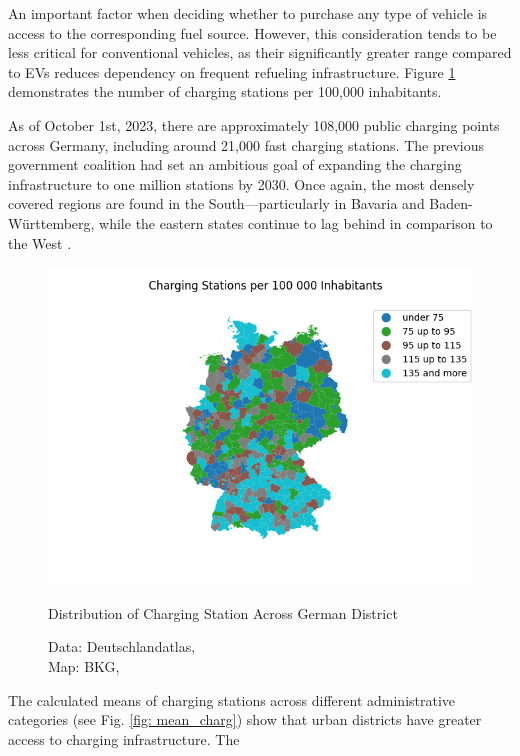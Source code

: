 An important factor when deciding whether to purchase any type of vehicle is access to the corresponding fuel source. However, this consideration tends to be less critical for conventional vehicles, as their significantly greater range compared to EVs reduces dependency on frequent refueling infrastructure. Figure \ref{fig: charg_stat} demonstrates the number of charging stations per 100,000 inhabitants.

As of October 1st, 2023, there are approximately 108,000 public charging points across Germany, including around 21,000 fast charging stations. The previous government coalition had set an ambitious goal of expanding the charging infrastructure to one million stations by 2030. Once again, the most densely covered regions are found in the South—particularly in Bavaria and Baden-Württemberg, while the eastern states continue to lag behind in comparison to the West \cite{DeAtlasCharge}.
\begin{figure}[H]
	\begin{center}
		\includegraphics[width=\linewidth]{images/Charging_stations}
		\caption{Distribution of Charging Station Across German District}
		\label{fig: charg_stat}
		\caption*{Data: Deutschlandatlas, \cite{DeAtlasEVXLSX} \\
  				Map: BKG, \cite{BKG} } 
	\end{center} 
\end{figure}
The calculated means of charging stations across different administrative categories (see Fig. \ref{fig: mean_charg}) show that urban districts have greater access to charging infrastructure. The 
